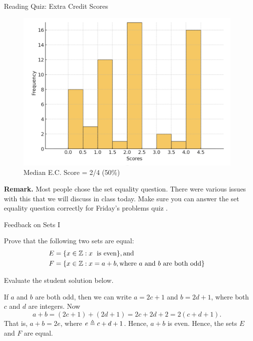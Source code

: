 \documentclass[10pt]{beamer}
\begin{document}
\begin{frame}{Reading Quiz: Extra Credit Scores}
\footnotesize 
\begin{figure}[ht]
        \centering
        \includegraphics[width=.75\textwidth]{images/ec_quiz_scores}
   		 \caption{Median E.C. Score = 2/4 (50\%)}
\end{figure}
\vfill 
\textbf{Remark.} Most people chose the set equality question. There were various issues with this that we will discuss in class today.  \alertstar Make sure you can answer the set equality question correctly for Friday's problems quiz \alertstar.
\end{frame}


\begin{frame}[standout]
Feedback on Sets I 
\end{frame}




\begin{frame}

 \begin{mygreenbox}[title=Problem]
Prove that the following two sets are equal:
%
\begin{align*}
E &= \{ {x \in \mathbb{Z}: x \text{\; is even}} \}, \text{and} \\
F &= \{ {x \in \mathbb{Z}: x=a+b, \text{where $a$ and $b$ are both odd}} \}
\end{align*}
\end{mygreenbox}

\vfill 
 \begin{myyellowbox}[title=Puzzle]
Evaluate the student solution below. 
\end{myyellowbox}

\vfill 
 \begin{myredbox}[title=Student Solution]
If $a$ and $b$ are both odd, then we can write $a=2c+1$ and $b=2d+1$, where both $c$ and $d$ are integers.  Now 
\[ a+b = (2c+1) + (2d+1) = 2c+2d+2 = 2(c+d+1).\]
That is, $a+b=2e$, where $e \triangleq c+d+1$.  Hence, $a+b$ is even.  Hence,  the sets $E$ and $F$ are equal. 
\end{myredbox}
\end{frame}
\end{document}
